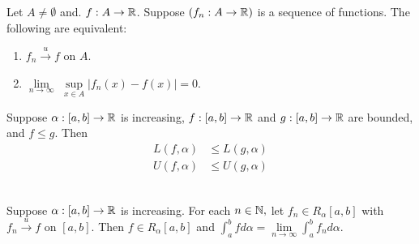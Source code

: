 \begin{lemma}
    \label{lemma7.1}
    Let $A \neq \emptyset$ and. $f: A \to \mathbb{R}$. Suppose $(f_n:A \to \mathbb{R})$ is a sequence of functions. The following are equivalent:
    \begin{enumerate}
        \item $f_n \overset{u}{\to} f$ on $A$.
        \item $\lim \limits_{n\to \infty}$ $\underset{x \in A}{\sup}\left|f_n(x) - f(x)\right| = 0.$
    \end{enumerate}
\end{lemma}

\begin{lemma}
    \label{lemma7.2}
    Suppose $\alpha: [a,b] \to \mathbb{R}$ is increasing, $f:[a,b] \to \mathbb{R}$ and $g:[a,b] \to \mathbb{R}$ are bounded, and $f \leq g.$ Then
    \begin{align*}
        L(f, \alpha) &\leq L(g, \alpha) \\
        U(f, \alpha) &\leq U(g, \alpha)
    \end{align*}
\end{lemma}

\begin{theorem}\leavevmode \\
    \label{thm7.16}
    Suppose $\alpha: [a,b] \to \mathbb{R}$ is increasing. For each $n \in \mathbb{N},$ let $f_n \in R_\alpha[a,b]$ with $f_n \overset{u}{\to} f$ on $[a,b].$ Then $f \in R_\alpha[a,b]$ and $\int_a^b f d\alpha = \lim \limits_{n \to \infty}\int_a^b f_n d\alpha$.
\end{theorem}

